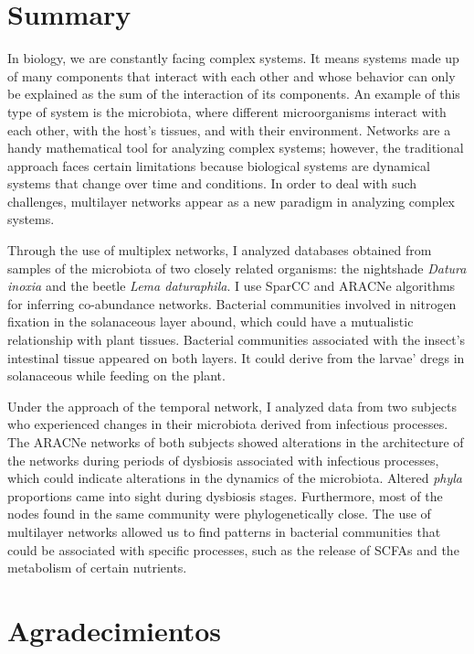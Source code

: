 \documentclass[
]{book}
\begin{document}
\hypertarget{summary}{%
\section*{Summary}\label{summary}}

In biology, we are constantly facing complex systems. It means systems made up of many components that interact with each other and whose behavior can only be explained as the sum of the interaction of its components. An example of this type of system is the microbiota, where different microorganisms interact with each other, with the host's tissues, and with their environment. Networks are a handy mathematical tool for analyzing complex systems; however, the traditional approach faces certain limitations because biological systems are dynamical systems that change over time and conditions. In order to deal with such challenges, multilayer networks appear as a new paradigm in analyzing complex systems.

Through the use of multiplex networks, I analyzed databases obtained from samples of the microbiota of two closely related organisms: the nightshade \emph{Datura inoxia} and the beetle \emph{Lema daturaphila}. I use SparCC and ARACNe algorithms for inferring co-abundance networks. Bacterial communities involved in nitrogen fixation in the solanaceous layer abound, which could have a mutualistic relationship with plant tissues. Bacterial communities associated with the insect's intestinal tissue appeared on both layers. It could derive from the larvae' dregs in solanaceous while feeding on the plant.

Under the approach of the temporal network, I analyzed data from two subjects who experienced changes in their microbiota derived from infectious processes. The ARACNe networks of both subjects showed alterations in the architecture of the networks during periods of dysbiosis associated with infectious processes, which could indicate alterations in the dynamics of the microbiota. Altered \emph{phyla} proportions came into sight during dysbiosis stages. Furthermore, most of the nodes found in the same community were phylogenetically close. The use of multilayer networks allowed us to find patterns in bacterial communities that could be associated with specific processes, such as the release of SCFAs and the metabolism of certain nutrients.

\hypertarget{agradecimientos}{%
\section*{Agradecimientos}\label{agradecimientos}}
\end{document}
